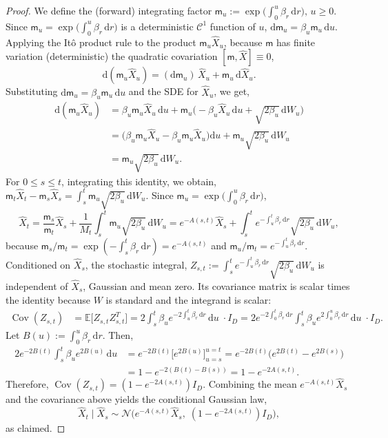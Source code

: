 \documentclass[12pts]{article}
\newcommand{\hX}{ \widehat{X}}
\begin{document}
\begin{proof}
We define the (forward) integrating factor
\(\mathsf{m}_u:=\exp\!\Big(\int_0^u \beta_r\,\mathrm dr\Big), \, u\ge0.\) Since $\mathsf{m}_u=\exp\big(\int_0^u\beta_r\,\mathrm dr\big)$ is a deterministic $\mathscr{C}^1$ function of $u$,
\( \mathrm d\mathsf{m}_u=\beta_u \mathsf{m}_u\,\mathrm du.\) Applying the It\^o product rule to the product $\mathsf{m}_u\widehat X_u$,  because $\mathsf{m}$ has finite variation (deterministic) the quadratic covariation $[\mathsf{m},\widehat X]\equiv0$, 
\[
\mathrm d(\mathsf{m}_u\widehat X_u)
= (\mathrm d\mathsf{m}_u)\,\widehat X_u + \mathsf{m}_u\,\mathrm d\widehat X_u.
\]
Substituting $\mathrm d\mathsf{m}_u=\beta_u \mathsf{m}_u\,\mathrm du$ and the SDE for $\widehat X_u$, we get,
\[
\begin{aligned}
\mathrm d(\mathsf{m}_u\widehat X_u)
&= \beta_u \mathsf{m}_u \widehat X_u\,\mathrm du
   + \mathsf{m}_u\big(-\beta_u\widehat X_u\,\mathrm du + \sqrt{2\beta_u}\,\mathrm dW_u\big) \\
&= \big(\beta_u \mathsf{m}_u\widehat X_u - \beta_u \mathsf{m}_u\widehat X_u\big)\mathrm du
   + \mathsf{m}_u\sqrt{2\beta_u}\,\mathrm dW_u \\
&= \mathsf{m}_u\sqrt{2\beta_u}\,\mathrm dW_u.
\end{aligned}
\]
 For $0\le s\le t$, integrating this identity, we obtain,
\(\mathsf{m}_t\widehat X_t - \mathsf{m}_s\widehat X_s = \int_s^t \mathsf{m}_u\sqrt{2\beta_u}\,\mathrm dW_u.\)
Since $\mathsf{m}_u=\exp\big(\int_0^u\beta_r\,\mathrm dr\big)$,
\[
\widehat X_t
= \frac{\mathsf{m}_s}{\mathsf{m}_t}\widehat X_s + \frac{1}{M_t}\int_s^t \mathsf{m}_u\sqrt{2\beta_u}\,\mathrm dW_u
= e^{-A(s,t)}\widehat X_s + \int_s^t e^{-\int_u^t\beta_r\,\mathrm dr}\sqrt{2\beta_u}\,\mathrm dW_u,
\]
because $\mathsf{m}_s/\mathsf{m}_t=\exp(-\int_s^t\beta_r\,\mathrm dr)=e^{-A(s,t)}$ and $\mathsf{m}_u/\mathsf{m}_t=e^{-\int_u^t\beta_r\,\mathrm dr}$. Conditioned on  $\widehat X_s$, the stochastic integral,
\(Z_{s,t}:=\int_s^t e^{-\int_u^t\beta_r\,\mathrm dr}\sqrt{2\beta_u}\,\mathrm dW_u\)
is independent of $\hX_s$, Gaussian and mean zero. Its covariance matrix is scalar times the identity because $W$ is standard and the integrand is scalar:
\[
\begin{aligned}
\operatorname{Cov}(Z_{s,t})
&= \mathbb E\big[Z_{s,t}Z_{s,t}^T\big]
= 2\int_s^t \beta_u e^{-2\int_u^t\beta_r\,\mathrm dr}\,\mathrm du\; \cdot I_D = 2 e^{-2\int_0^t\beta_r\,\mathrm dr}\int_s^t \beta_u e^{2\int_0^u\beta_r\,\mathrm dr}\,\mathrm du\; \cdot I_D.
\end{aligned}
\]
Let $B(u):=\int_0^u\beta_r\,\mathrm dr$. Then,
\[
\begin{aligned}
2 e^{-2B(t)}\int_s^t \beta_u e^{2B(u)}\,\mathrm du
&= e^{-2B(t)}\Big[ e^{2B(u)}\Big]_{u=s}^{u=t}
= e^{-2B(t)}\big(e^{2B(t)}-e^{2B(s)}\big) \\
&= 1 - e^{-2(B(t)-B(s))} = 1 - e^{-2A(s,t)}.
\end{aligned}
\]
Therefore, $\operatorname{Cov}(Z_{s,t})=(1-e^{-2A(s,t)})I_D$. Combining the mean $e^{-A(s,t)}\widehat X_s$ and the covariance above yields the conditional Gaussian law,
\[
\widehat X_t\mid\widehat X_s \sim \mathcal N\!\big(e^{-A(s,t)}\widehat X_s,\; (1-e^{-2A(s,t)})I_D\big),
\]
as claimed.
\end{proof}
\end{document}
